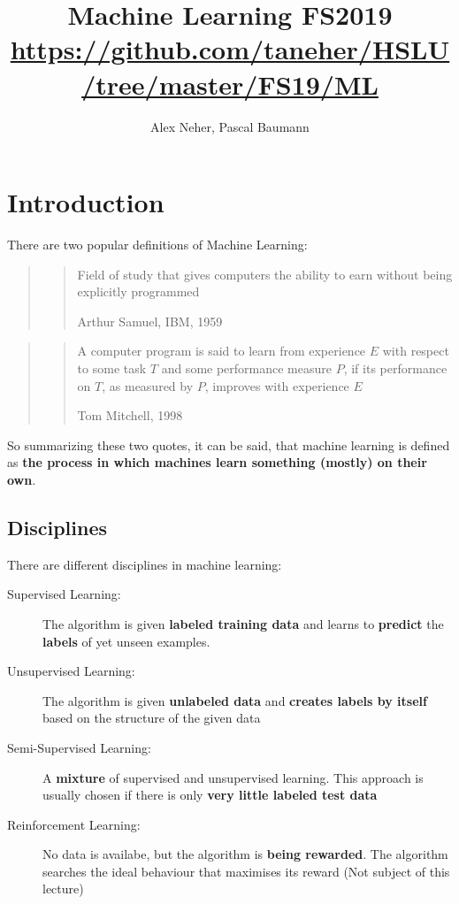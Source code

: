 \documentclass[11pt]{article}
\begin{document}
\title{Machine Learning FS2019\\[0.2em]\normalsize{\url{https://github.com/taneher/HSLU/tree/master/FS19/ML}}}
\author{Alex Neher, Pascal Baumann}
\maketitle

\tableofcontents

\newpage
\graphicspath{{./Pictures/}}

\section{Introduction}

There are two popular definitions of Machine Learning:

\begin{centering}
    \begin{quote}
        \blockquote[Arthur Samuel, IBM, 1959]{Field of study that gives computers the ability to earn without being explicitly programmed}
    \end{quote}

    \begin{quote}
        \blockquote[Tom Mitchell, 1998]{A computer program is said to learn from experience $E$ with respect to some task $T$ and some performance measure $P$, if its performance on $T$, as measured by $P$, improves with experience $E$}
    \end{quote}
\end{centering}

So summarizing these two quotes, it can be said, that machine learning is defined as \textbf{the process in which machines learn something (mostly) on their own}.

\subsection{Disciplines}

There are different disciplines in machine learning:

\begin{description}
    \item[Supervised Learning: ] The algorithm is given \textbf{labeled training data} and learns to \textbf{predict} the \textbf{labels} of yet unseen examples.
    \item[Unsupervised Learning: ] The algorithm is given \textbf{unlabeled data} and \textbf{creates labels by itself} based on the structure of the given data
    \item[Semi-Supervised Learning: ] A \textbf{mixture} of supervised and unsupervised learning. This approach is usually chosen if there is only \textbf{very little labeled test data}
    \item[Reinforcement Learning: ] No data is availabe, but the algorithm is \textbf{being rewarded}. The algorithm searches the ideal behaviour that maximises its reward (Not subject of this lecture)
\end{description}
\end{document}
